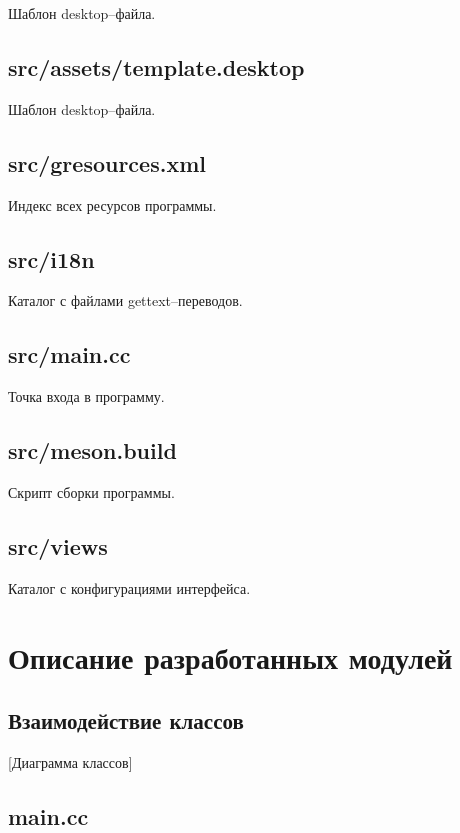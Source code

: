 \documentclass[variant=courcework]{bsuir}
\begin{document}
Шаблон desktop--файла.

\subsection{src/assets/template.desktop}

Шаблон desktop--файла.

\subsection{src/gresources.xml}

Индекс всех ресурсов программы.

\subsection{src/i18n}

Каталог с файлами gettext--переводов.

\subsection{src/main.cc}

Точка входа в программу.

\subsection{src/meson.build}

Скрипт сборки программы.

\subsection{src/views}

Каталог с конфигурациями интерфейса.

\section{Описание разработанных модулей}

\subsection{Взаимодействие классов}

[Диаграмма классов]

\subsection{main.cc}
\end{document}
